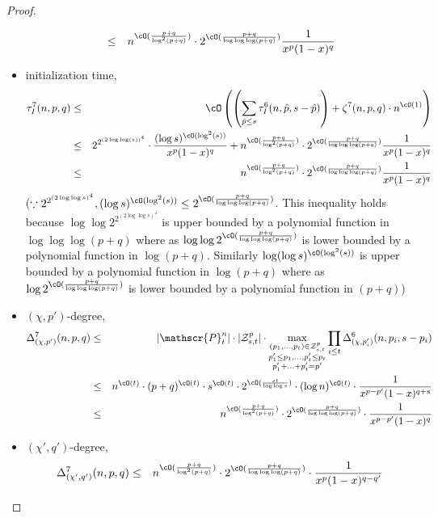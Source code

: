 \begin{proof}
\begin{itemize}
\begin{eqnarray*}
&\leq& n^{\cO(\frac{p+q}{\log^2(p+q)})} \cdot 2^{\cO(\frac{p+q}{\log\log\log(p+q)})} \frac{1}{x^p(1-x)^q}
\end{eqnarray*}
\item initialization time,
\begin{eqnarray*}
 \tau_I^7(n,p,q) &\leq& \cO\left(\left(\sum_{\hat{p} \leq s} \tau_I^6(n,\hat{p},s-\hat{p})\right) + \zeta^7(n,p,q) \cdot n^{\cO(1)}\right)\\
&\leq& 2^{2^{(2\log\log (s))^4}}\cdot \frac{(\log s )^{\cO(\log^2(s))}}{x^p(1-x)^q} + n^{\cO(\frac{p+q}{\log^2(p+q)})} \cdot 2^{\cO(\frac{p+q}{\log\log\log(p+q)})} \frac{1}{x^p(1-x)^q}\\
&\leq& n^{\cO(\frac{p+q}{\log^2(p+q)})} \cdot 2^{\cO(\frac{p+q}{\log\log\log(p+q)})} \frac{1}{x^p(1-x)^q}\\
\end{eqnarray*}
($\because 2^{2^{(2\log \log s)^4}} , (\log s )^{\cO(\log^2(s))} \leq 2^{\cO(\frac{p+q}{\log \log\log(p+q)})}$.
This inequality holds because $\log\log 2^{2^{(2\log \log s)^4}}$ is upper bounded by a polynomial function in 
$\log\log\log(p+q)$ where as $\log\log 2^{\cO(\frac{p+q}{\log \log\log(p+q)})}$ is lower bounded by a polynomial 
function in $\log(p+q)$. Similarly $\log (\log s )^{\cO(\log^2(s))}$ is upper bounded by a polynomial function in 
$\log(p+q)$ where as $\log 2^{\cO(\frac{p+q}{\log \log\log(p+q)})}$ is lower bounded by a polynomial function in $(p+q)$)
\item $(\chi,p')$-degree, 
\begin{eqnarray*}
\Delta_{(\chi,p')}^7(n,p,q) &\leq& |\mathscr{P}_t^n|\cdot |{\cal Z}_{s,t}^{p}|\cdot 
\max_{\substack{(p_1,\ldots,p_t) \in {\cal Z}_{s,t}^{p} \\ p_1'\leq p_1,\ldots, p_t'\leq p_t \\ p_1'+\ldots+p_t'=p'  }} \prod_{i \leq t}  \Delta_{(\chi,p_i')}^6(n,p_i,s-p_i)\\
&\leq& n^{\cO(t)}\cdot(p+q)^{\cO(t)}\cdot s^{\cO(t)} \cdot 2^{\cO(\frac{st}{\log\log s})}\cdot (\log n)^{\cO(t)}\cdot \frac{1}{x^{p-p'}(1-x)^{q+s}}\\
&\leq& n^{\cO(\frac{p+q}{\log^2(p+q)})} \cdot 2^{\cO(\frac{p+q}{\log\log\log(p+q)})} \cdot \frac{1}{x^{p-p'}(1-x)^{q}}
\end{eqnarray*}
\item $(\chi',q')$-degree, 
\begin{eqnarray*}
\Delta_{(\chi',q')}^7(n,p,q) 
&\leq& n^{\cO(\frac{p+q}{\log^2(p+q)})} \cdot 2^{\cO(\frac{p+q}{\log\log\log(p+q)})} \cdot \frac{1}{x^{p}(1-x)^{q-q'}}

\end{eqnarray*}
\end{itemize}
\end{proof}
